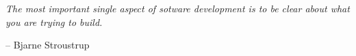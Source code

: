\epigraph{\textit{The most important single aspect of sotware development is to be clear about what you are trying to build.}}{-- \textup{Bjarne Stroustrup}}
